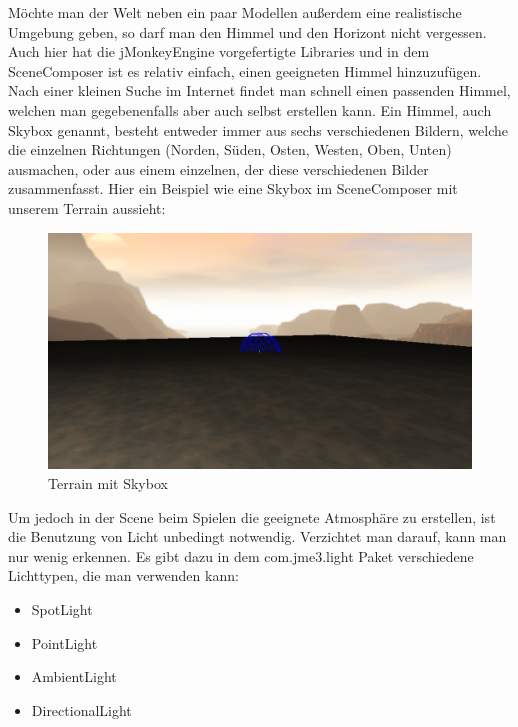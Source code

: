 Möchte man der Welt neben ein paar Modellen außerdem eine realistische Umgebung geben, so darf man den Himmel und den Horizont nicht vergessen. Auch hier hat die jMonkeyEngine vorgefertigte Libraries und in dem SceneComposer ist es relativ einfach, einen geeigneten Himmel hinzuzufügen. Nach einer kleinen Suche im Internet findet man schnell einen passenden Himmel, welchen man gegebenenfalls aber auch selbst erstellen kann. Ein Himmel, auch Skybox genannt, besteht entweder immer aus sechs verschiedenen Bildern, welche die einzelnen Richtungen (Norden, Süden, Osten, Westen, Oben, Unten) ausmachen, oder aus einem einzelnen, der diese verschiedenen Bilder zusammenfasst. Hier ein Beispiel wie eine Skybox im SceneComposer mit unserem Terrain aussieht:
\begin{center}
	\begin{figure}[h!]
		
		
		\caption{Terrain mit Skybox}
		
		\includegraphics[width=.8\linewidth]{images/Skybox} 
		
	\end{figure}  
\end{center}


Um jedoch in der Scene beim Spielen die geeignete Atmosphäre zu erstellen, ist die Benutzung von Licht unbedingt notwendig. Verzichtet man darauf, kann man nur wenig erkennen. Es gibt dazu in dem com.jme3.light Paket verschiedene Lichttypen, die man verwenden kann:
\begin{itemize}
	\item SpotLight
	\item PointLight
	\item AmbientLight
	\item DirectionalLight
\end{itemize}

